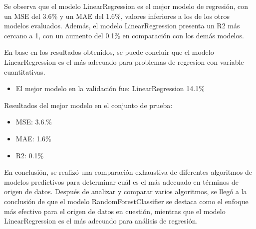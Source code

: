Se observa que el modelo LinearRegression es el mejor modelo de regresión, con un MSE del 3.6\% y un MAE del 1.6\%, valores inferiores a los de los otros modelos evaluados. Además, el modelo LinearRegression presenta un R2 más cercano a 1, con un aumento del 0.1\% en comparación con los demás modelos.

En base en los resultados obtenidos, se puede concluir que el modelo LinearRegression es el más adecuado para problemas de regresion con variable cuantitativas.

\begin{itemize}
    \item El mejor modelo en la validación fue: LinearRegression 14.1\%
\end{itemize}

Resultados del mejor modelo en el conjunto de prueba:

\begin{itemize}
    \item MSE: 3.6.\%
    \item MAE: 1.6\%
    \item R2: 0.1\%
\end{itemize}

En conclusión, se realizó una comparación exhaustiva de diferentes algoritmos de modelos predictivos para determinar cuál es el más adecuado en términos de origen de datos. Después de analizar y comparar varios algoritmos, se llegó a la conclusión de que el modelo RandomForestClassifier se destaca como el enfoque más efectivo para el origen de datos en cuestión, mientras que el modelo LinearRegression es el más adecuado para análisis de regresión.